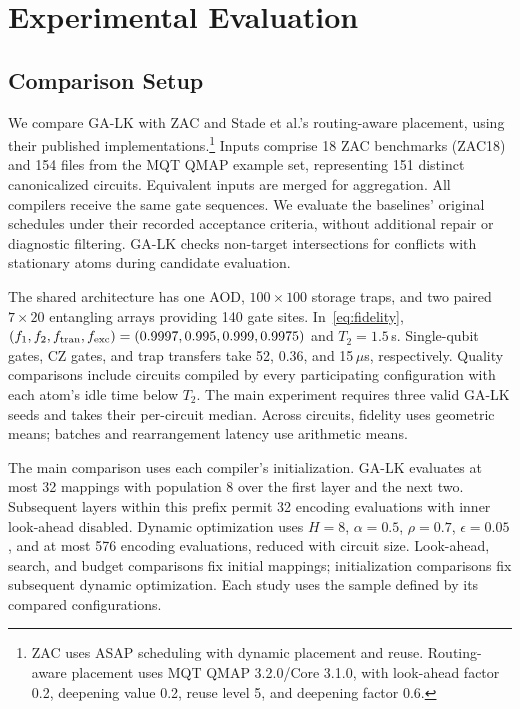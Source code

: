 \section{Experimental Evaluation}
\label{sec:evaluation}

\subsection{Comparison Setup}
\label{sec:experimental-setup}

We compare GA-LK with ZAC\cite{lin2025zac} and Stade et al.'s routing-aware placement\cite{stade2025routingaware}, using their published implementations.\footnote{ZAC uses ASAP scheduling with dynamic placement and reuse. Routing-aware placement uses MQT QMAP 3.2.0/Core 3.1.0, with look-ahead factor 0.2, deepening value 0.2, reuse level 5, and deepening factor 0.6.} Inputs comprise 18 ZAC benchmarks (ZAC18)\cite{lin2025zac} and 154 files from the MQT QMAP example set\cite{wille2023qmap}, representing 151 distinct canonicalized circuits. Equivalent inputs are merged for aggregation. All compilers receive the same gate sequences. We evaluate the baselines' original schedules under their recorded acceptance criteria, without additional repair or diagnostic filtering. GA-LK checks non-target intersections for conflicts with stationary atoms during candidate evaluation.

The shared architecture has one AOD, $100\times100$ storage traps, and two paired $7\times20$ entangling arrays providing 140 gate sites. In~\eqref{eq:fidelity}, $(f_1,\allowbreak f_2,\allowbreak f_{\rm tran},\allowbreak f_{\rm exc})=(0.9997,\allowbreak 0.995,\allowbreak 0.999,\allowbreak 0.9975)$ and $T_2=1.5$\,s. Single-qubit gates, CZ gates, and trap transfers take 52, 0.36, and 15\,$\mu$s, respectively. Quality comparisons include circuits compiled by every participating configuration with each atom's idle time below $T_2$. The main experiment requires three valid GA-LK seeds and takes their per-circuit median. Across circuits, fidelity uses geometric means; batches and rearrangement latency use arithmetic means.

The main comparison uses each compiler's initialization. GA-LK evaluates at most 32 mappings with population 8 over the first layer and the next two. Subsequent layers within this prefix permit 32 encoding evaluations with inner look-ahead disabled. Dynamic optimization uses $H=8$, $\alpha=0.5$, $\rho=0.7$, $\epsilon=0.05$, and at most 576 encoding evaluations, reduced with circuit size. Look-ahead, search, and budget comparisons fix initial mappings; initialization comparisons fix subsequent dynamic optimization. Each study uses the sample defined by its compared configurations.

